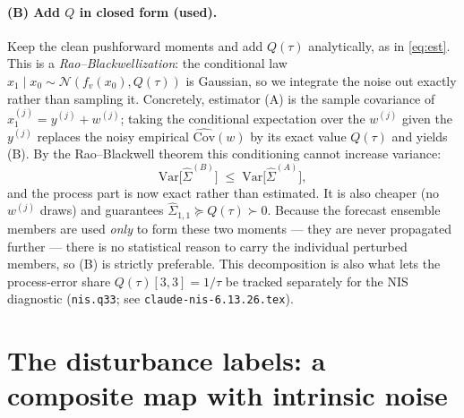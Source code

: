 \documentclass[11pt]{article}
\newcommand{\code}[1]{\texttt{#1}}
\newcommand{\Var}{\mathrm{Var}}
\newcommand{\Cov}{\mathrm{Cov}}
\newcommand{\Norm}{\mathcal{N}}
\begin{document}
\paragraph{(B) Add $Q$ in closed form (used).} Keep the clean pushforward moments and add
$Q(\tau)$ analytically, as in \eqref{eq:est}. This is a \emph{Rao--Blackwellization}: the
conditional law $x_1\mid x_0\sim\Norm(f_v(x_0),Q(\tau))$ is Gaussian, so we integrate the
noise out exactly rather than sampling it. Concretely, estimator (A) is the sample
covariance of $x_1^{(j)}=y^{(j)}+w^{(j)}$; taking the conditional expectation over the
$w^{(j)}$ given the $y^{(j)}$ replaces the noisy empirical $\widehat{\Cov}(w)$ by its exact
value $Q(\tau)$ and yields (B). By the Rao--Blackwell theorem this conditioning cannot
increase variance:
\[
\Var\big[\hat\Sigma^{(B)}\big]\;\le\;\Var\big[\hat\Sigma^{(A)}\big],
\]
and the process part is now exact rather than estimated. It is also cheaper (no $w^{(j)}$
draws) and guarantees $\hat\Sigma_{1,1}\succeq Q(\tau)\succ0$. Because the forecast
ensemble members are used \emph{only} to form these two moments --- they are never
propagated further --- there is no statistical reason to carry the individual perturbed
members, so (B) is strictly preferable. This decomposition is also what lets the
process-error share $Q(\tau)[3,3]=1/\tau$ be tracked separately for the NIS diagnostic
(\code{nis.q33}; see \code{claude-nis-6.13.26.tex}).

\section{The disturbance labels: a composite map with intrinsic noise}
\label{sec:disturb}
\end{document}
